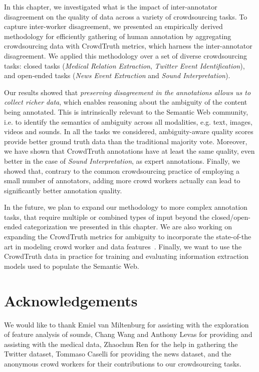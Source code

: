 In this chapter, we investigated what is the impact of inter-annotator disagreement on the quality of data across a variety of crowdsourcing tasks. To capture inter-worker disagreement, we presented an empirically derived methodology for efficiently gathering of human annotation by aggregating crowdsourcing data with CrowdTruth metrics, which harness the inter-annotator disagreement. We applied this methodology over a set of diverse crowdsourcing tasks: closed tasks (\textit{Medical Relation Extraction}, \textit{Twitter Event Identification}), and open-ended tasks (\textit{News Event Extraction} and \textit{Sound Interpretation}).

 Our results showed that \textit{preserving disagreement in the annotations allows us to collect richer data}, which enables reasoning about the ambiguity of the content being annotated. This is intrinsically relevant to the Semantic Web community, i.e. to identify the semantics of ambiguity across all modalities, e.g. text, images, videos and sounds. In all the tasks we considered, ambiguity-aware quality scores provide better ground truth data than the traditional majority vote. Moreover, we have shown that CrowdTruth annotations have at least the same quality, even better in the case of \textit{Sound Interpretation}, as expert annotations. Finally, we showed that, contrary to the common crowdsourcing practice of employing a small number of annotators, adding more crowd workers actually can lead to significantly better annotation quality.

In the future, we plan to expand our methodology to more complex annotation tasks, that require multiple or combined types of input beyond the closed/open-ended categorization we presented in this chapter. We are also working on expanding the CrowdTruth metrics for ambiguity to incorporate the state-of-the art in modeling crowd worker and data features~\cite{felt2015early}. Finally, we want to use the CrowdTruth data in practice for training and evaluating information extraction models used to populate the Semantic Web.



\section*{Acknowledgements}

We would like to thank Emiel van Miltenburg for assisting with the exploration of feature analysis of sounds, Chang Wang and Anthony Levas for providing and assisting with the medical data, Zhaochun Ren for the help in gathering the Twitter dataset, Tommaso Caselli for providing the news dataset, and the anonymous crowd workers for their contributions to our crowdsourcing tasks.


